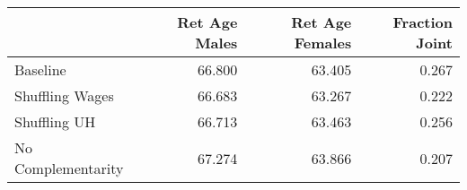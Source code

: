 \begin{tabular}{lrrr}
\toprule
{} & Ret Age Males & Ret Age Females & Fraction Joint \\
\midrule
Baseline           &        66.800 &          63.405 &          0.267 \\
Shuffling Wages    &        66.683 &          63.267 &          0.222 \\
Shuffling UH       &        66.713 &          63.463 &          0.256 \\
No Complementarity &        67.274 &          63.866 &          0.207 \\
\bottomrule
\end{tabular}
